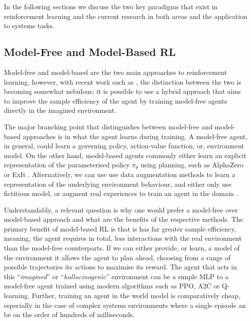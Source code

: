 In the following sections we discuss the two key paradigms that exist in reinforcement learning and the current research in both areas and the application to systems tasks.

\subsection{Model-Free and Model-Based RL}

Model-free and model-based are the two main approaches to reinforcement learning, however, with recent work such as \cite{app10196685, kaiser2020modelbased, robine2021smaller}, the distinction between the two is becoming somewhat nebulous; it is possible to use a hybrid approach that aims to improve the sample efficiency of the agent by training model-free agents directly in the imagined environment.

The major branching point that distinguishes between model-free and model-based approaches is in what the agent learns during training. A model-free agent, in general, could learn a governing policy, action-value function, or, environment model. On the other hand, model-based agents commonly either learn an explicit representation of the parameterised policy $\pi_\theta$ using planning, such as AlphaZero \cite{silver2017mastering} or ExIt \cite{anthony2017thinking}. Alternatively, we can use use data augmentation methods to learn a representation of the underlying environment behaviour, and either only use fictitious model, or augment real experiences to train an agent in the domain \cite{kaiser2020modelbased, feinberg2018modelbased, freeman2019learning}.

Understandably, a relevant question is why one would prefer a model-free over model-based approach and what are the benefits of the respective methods. The primary benefit of model-based RL is that is has far greater sample efficiency, meaning, the agent requires in total, less interactions with the real environment than the model-free counterparts. If we can either provide, or learn, a model of the environment it allows the agent to plan ahead, choosing from a range of possible trajectories its actions to maximise its reward. The agent that acts in this ``\textit{imagined}'' or ``\textit{hallucinogenic}'' environment can be a simple MLP \cite{ha2018worldmodels} to a model-free agent trained using modern algorithms such as PPO, A2C or Q-learning. Further, training an agent in the world model is comparatively cheap, especially in the case of complex systems environments where a single episode an be on the order of hundreds of milliseconds.


